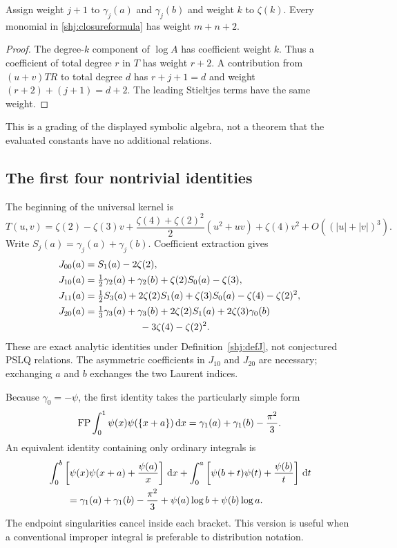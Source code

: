 \begin{corollary}\label{shj:weight}
Assign weight $j+1$ to $\gamma_j(a)$ and $\gamma_j(b)$ and weight $k$ to $\zeta(k)$. Every monomial in \eqref{shj:closureformula} has weight $m+n+2$.
\end{corollary}
\begin{proof}
The degree-$k$ component of $\log A$ has coefficient weight $k$. Thus a coefficient of total degree $r$ in $T$ has weight $r+2$. A contribution from $(u+v)TR$ to total degree $d$ has $r+j+1=d$ and weight $(r+2)+(j+1)=d+2$. The leading Stieltjes terms have the same weight.
\end{proof}
This is a grading of the displayed symbolic algebra, not a theorem that the evaluated constants have no additional relations.

\subsection{The first four nontrivial identities}
The beginning of the universal kernel is
\begin{equation}\label{shj:Tstart}
T(u,v)=\zeta(2)-\zeta(3)v
+\frac{\zeta(4)+\zeta(2)^2}{2}(u^2+uv)
+\zeta(4)v^2+O((|u|+|v|)^3).
\end{equation}
Write $S_j(a)=\gamma_j(a)+\gamma_j(b)$. Coefficient extraction gives
\begin{align}
J_{00}(a)&=S_1(a)-2\zeta(2),\label{shj:J00}\\
J_{10}(a)&=\tfrac12\gamma_2(a)+\gamma_2(b)
+\zeta(2)S_0(a)-\zeta(3),\label{shj:J10}\\
J_{11}(a)&=\tfrac12 S_3(a)+2\zeta(2)S_1(a)+\zeta(3)S_0(a)
-\zeta(4)-\zeta(2)^2,\label{shj:J11}\\
J_{20}(a)&=\tfrac13\gamma_3(a)+\gamma_3(b)+2\zeta(2)S_1(a)
+2\zeta(3)\gamma_0(b)\notag\\
&\hspace{2cm}-3\zeta(4)-\zeta(2)^2.\label{shj:J20}
\end{align}
These are exact analytic identities under Definition~\ref{shj:defJ}, not conjectured PSLQ relations. The asymmetric coefficients in $J_{10}$ and $J_{20}$ are necessary; exchanging $a$ and $b$ exchanges the two Laurent indices.

Because $\gamma_0=-\psi$, the first identity takes the particularly simple form
\begin{equation}\label{shj:psipsi}
\operatorname{FP}\int_0^1\psi(x)\psi(\{x+a\})\,\mathrm{d} x
=\gamma_1(a)+\gamma_1(b)-\frac{\pi^2}{3}.
\end{equation}
An equivalent identity containing only ordinary integrals is
\begin{align}
&\int_0^b\left[\psi(x)\psi(x+a)+\frac{\psi(a)}x\right]\,\mathrm{d} x
+\int_0^a\left[\psi(b+t)\psi(t)+\frac{\psi(b)}t\right]\,\mathrm{d} t\notag\\
&\qquad=\gamma_1(a)+\gamma_1(b)-\frac{\pi^2}{3}
+\psi(a)\log b+\psi(b)\log a.
\label{shj:psipsireg}
\end{align}
The endpoint singularities cancel inside each bracket. This version is useful when a conventional improper integral is preferable to distribution notation.

